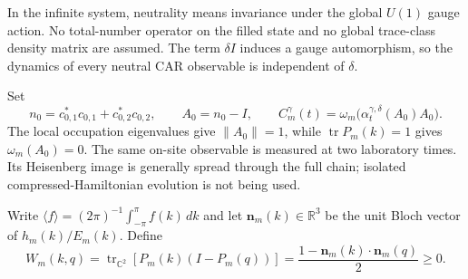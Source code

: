 \documentclass[11pt]{article}
\theoremstyle{definition}
\begin{document}
In the infinite system, neutrality means invariance under the global
$U(1)$ gauge action. No total-number operator on the filled state and no
global trace-class density matrix are assumed. The term $\delta I$ induces
a gauge automorphism, so the dynamics of every neutral CAR observable is
independent of $\delta$.

Set
\[
 n_0=c_{0,1}^*c_{0,1}+c_{0,2}^*c_{0,2},\qquad A_0=n_0-I,
 \qquad C_m^\gamma(t)=\omega_m\bigl(\alpha_t^{\gamma,\delta}(A_0)A_0\bigr).
\]
The local occupation eigenvalues give $\|A_0\|=1$, while
$\operatorname{tr}P_m(k)=1$ gives $\omega_m(A_0)=0$. The same on-site
observable is measured at two laboratory times. Its Heisenberg image is
generally spread through the full chain; isolated compressed-Hamiltonian
evolution is not being used.

Write $\langle f\rangle=(2\pi)^{-1}\int_{-\pi}^{\pi}f(k)\,dk$ and let
$\boldsymbol n_m(k)\in\mathbb R^3$ be the unit Bloch vector of
$h_m(k)/E_m(k)$. Define
\[
 W_m(k,q)=\operatorname{tr}_{\mathbb C^2}[P_m(k)(I-P_m(q))]
   =\frac{1-\boldsymbol n_m(k)\cdot\boldsymbol n_m(q)}2\ge0.
\]
\end{document}
